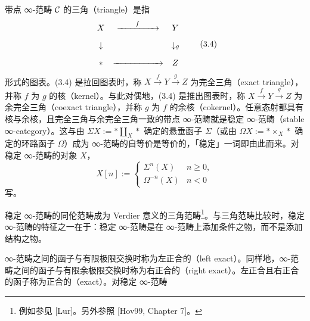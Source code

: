 带点 ∞-范畴 $\mathcal{C}$ 的三角（triangle）是指
\begin{equation}
    \begin{array}{ccc}
        X & \xrightarrow{\hspace*{7mm}f\hspace*{7mm}} & Y\\[9pt]
        \downarrow & & \downarrow\scriptstyle{g}\\[9pt]
        \ast & \xrightarrow{\hspace*{19mm}} & Z
    \end{array} \tag{3.4}
\end{equation}
形式的图表。(3.4) 是拉回图表时，称 $X\xrightarrow{f}Y\xrightarrow{g}Z$ 为完全三角（exact triangle），并称 $f$ 为 $g$ 的核（kernel）。与此对偶地，(3.4) 是推出图表时，称 $X\xrightarrow{f}Y\xrightarrow{g}Z$ 为余完全三角（coexact triangle），并称 $g$ 为 $f$ 的余核（cokernel）。任意态射都具有核与余核，且完全三角与余完全三角一致的带点 ∞-范畴就是稳定 ∞-范畴（stable ∞-category）。这与由 $\Sigma X := \ast\coprod_{X}\ast$ 确定的悬垂函子 $\Sigma$（或由 $\Omega X := \ast\times_{X}\ast$ 确定的环路函子 $\Omega$）成为 ∞-范畴的自等价是等价的，「稳定」一词即由此而来。对稳定 ∞-范畴的对象 $X$，
\begin{equation}
    X[n] :=
    \begin{cases}
        \Sigma^n(X) & n\ge0,\\
        \Omega^{-n}(X) & n<0
    \end{cases} \tag{3.5}
\end{equation}
写。

稳定 ∞-范畴的同伦范畴成为 Verdier 意义的三角范畴\footnote{例如参见 [Lur]。另外参照 [Hov99, Chapter 7]。}。与三角范畴比较时，稳定 ∞-范畴的特征之一在于：稳定 ∞-范畴是在 ∞-范畴上添加条件之物，而不是添加结构之物。

∞-范畴之间的函子与有限极限交换时称为左正合的（left exact）。同样地，∞-范畴之间的函子与有限余极限交换时称为右正合的（right exact）。左正合且右正合的函子称为正合的（exact）。对稳定 ∞-范畴

